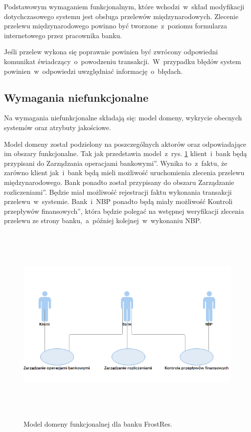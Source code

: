 Podstawowym wymaganiem funkcjonalnym, które wchodzi~w~skład modyfikacji dotychczasowego systemu jest obsługa przelewów międzynarodowych. Zlecenie przelewu międzynarodowego powinno być tworzone~z~poziomu formularza internetowego przez pracownika banku.

Jeśli przelew wykona się poprawnie powinien być zwrócony odpowiedni komunikat świadczący~o~powodzeniu transakcji.~W~przypadku błędów system powinien~w~odpowiedzi uwzględniać informację~o~błędach.

\subsection*{Wymagania niefunkcjonalne}
Na wymagania niefunkcjonalne składają się: model domeny, wykrycie obecnych systemów oraz atrybuty jakościowe.

Model domeny został podzielony na poszczególnych aktorów oraz odpowiadające im obszary funkcjonalne. Tak jak przedstawia model~z~rys. \ref{model_domeny_funk} klient~i~bank będą przypisani do \quotedblbase Zarządzania operacjami bankowymi\textquotedblright. Wynika to~z~faktu, że zarówno klient jak~i~bank będą mieli możliwość uruchomienia zlecenia przelewu międzynarodowego. Bank ponadto został przypisany do obszaru \quotedblbase Zarządzanie rozliczeniami\textquotedblright. Będzie miał możliwość rejestracji faktu wykonania transakcji przelewu~w~systemie. Bank~i~NBP ponadto będą miały możliwość \quotedblbase Kontroli przepływów finansowych\textquotedblright, która będzie polegać na wstępnej weryfikacji zlecenia przelewu ze strony banku,~a~później kolejnej~w~wykonaniu NBP.

\begin{figure}[h!tbp]
\begin{centering}
\includegraphics[width=13cm, height=10cm]{img/model_domeny_funk.png}
\caption[Model domeny funkcjonalnej dla banku FrostRes]{Model domeny funkcjonalnej dla banku FrostRes.}\label{model_domeny_funk}
\end{centering}
\end{figure}

